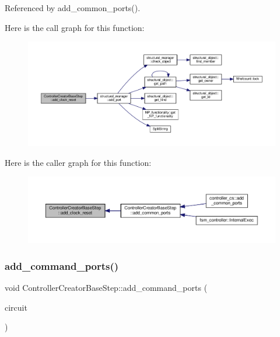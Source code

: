 Referenced by add\+\_\+common\+\_\+ports().

Here is the call graph for this function\+:
\nopagebreak
\begin{figure}[H]
\begin{center}
\leavevmode
\includegraphics[width=350pt]{d5/d28/classControllerCreatorBaseStep_af4f27f2275640d4ff0ab51374597b0ad_cgraph}
\end{center}
\end{figure}
Here is the caller graph for this function\+:
\nopagebreak
\begin{figure}[H]
\begin{center}
\leavevmode
\includegraphics[width=350pt]{d5/d28/classControllerCreatorBaseStep_af4f27f2275640d4ff0ab51374597b0ad_icgraph}
\end{center}
\end{figure}
\mbox{\label{classControllerCreatorBaseStep_a86b0917636dd8df88f42bb933e448bb9}} 
\subsubsection{\texorpdfstring{add\+\_\+command\+\_\+ports()}{add\_command\_ports()}}
{\footnotesize\ttfamily void Controller\+Creator\+Base\+Step\+::add\+\_\+command\+\_\+ports (\begin{DoxyParamCaption}\item[{\hyperlink{structural__objects_8hpp_a8ea5f8cc50ab8f4c31e2751074ff60b2}{structural\+\_\+object\+Ref}}]{circuit }\end{DoxyParamCaption})\hspace{0.3cm}{\ttfamily [private]}}



